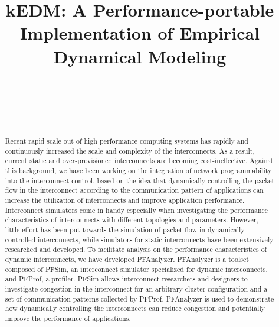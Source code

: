 \documentclass[conference]{IEEEtran}
\begin{document}
\title{kEDM: A Performance-portable Implementation of Empirical Dynamical Modeling}

\author{%
     \\
    \and
     \\
     \\
}

\maketitle

\begin{abstract}
    Recent rapid scale out of high performance computing systems has
    rapidly and continuously increased the scale and complexity of the
    interconnects. As a result, current static and over-provisioned
    interconnects are becoming cost-ineffective. Against this background, we have
    been working on the integration of network programmability into
    the interconnect control, based on the idea that dynamically controlling
    the packet flow in the interconnect according to the communication pattern
    of applications can increase the utilization of interconnects and improve
    application performance. Interconnect simulators come in handy especially
    when investigating the performance characteristics of interconnects with
    different topologies and parameters. However, little effort has been put
    towards the simulation of packet flow in dynamically controlled interconnects,
    while simulators for static interconnects have been extensively researched
    and developed. To facilitate analysis on the performance
    characteristics of dynamic interconnects, we have developed PFAnalyzer.
    PFAnalyzer is a toolset composed of PFSim, an interconnect simulator
    specialized for dynamic interconnects, and PFProf, a profiler.
    PFSim allows interconnect researchers and designers to investigate
    congestion in the interconnect for an arbitrary cluster configuration and
    a set of communication patterns collected by PFProf. PFAnalyzer is used
    to demonstrate how dynamically controlling the interconnects can reduce
    congestion and potentially improve the performance of applications.
\end{abstract}
\end{document}
